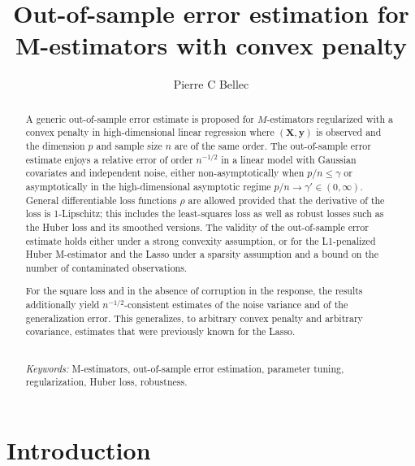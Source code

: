 \documentclass[11pt]{amsart}
\title{Out-of-sample error estimation for M-estimators with convex penalty}
\author{Pierre C Bellec}
\numberwithin{equation}{section}
\numberwithin{equation}{section}
\newcommand\onArxivOrInJournal[2]{#2}
\def\real{{\mathbb{R}}}
\def\R{{\real}}
\def\mathbold{\boldsymbol} %
\def\bc{\mathbold{c}}\def\chat{\widehat{c}}\def\ctil{\widetilde{c}}
\def\br{\mathbold{r}}\def\rhat{\widehat{r}}\def\rtil{\widetilde{r}}\def\rbar{{\overline r}}\def\brbar{{\overline \br}}
\def\bX{\mathbold{X}}\def\hbX{{\widehat{\bX}}}\def\tbX{{\widetilde{\bX}}}\def\bXbar{{\overline \bX}}
\def\by{\mathbold{y}}\def\yhat{\widehat{y}}\def\ytil{\widetilde{y}}\def\ybar{{\overline y}}\def\vby{{\bf y}}
\begin{document}
\begin{abstract}
{
A generic out-of-sample error estimate is proposed for $M$-estimators
regularized with a convex penalty in high-dimensional linear regression where
$(\bX,\by)$ is observed and the dimension $p$ and sample size $n$ are of the same
order.  The out-of-sample error estimate enjoys a relative error of order
$n^{-1/2}$ in a linear model with Gaussian covariates and independent noise,
either non-asymptotically when $p/n\le \gamma$ or asymptotically in the
high-dimensional asymptotic regime $p/n\to\gamma'\in(0,\infty)$.  General
differentiable loss functions $\rho$ are allowed provided that the derivative
of the loss is 1-Lipschitz; this includes the least-squares loss as well as
robust losses such as the Huber loss and its smoothed versions.  The validity
of the out-of-sample error estimate holds either under a strong convexity
assumption, or for the L1-penalized Huber M-estimator and the Lasso under a
sparsity assumption and a bound on the number of contaminated observations.

For the square loss and in the absence of corruption in the response, the
results additionally yield $n^{-1/2}$-consistent estimates of the noise
variance and of the generalization error. This generalizes, to arbitrary
convex penalty and arbitrary covariance, estimates that were previously known
for the Lasso.
}
{
    \onArxivOrInJournal{}{\\\emph{Keywords: }}
    M-estimators,
    out-of-sample error estimation,
    parameter tuning,
    regularization,
    Huber loss,
    robustness.
}
\end{abstract}
\onArxivOrInJournal{}{\maketitle}







\section{Introduction}
\end{document}
